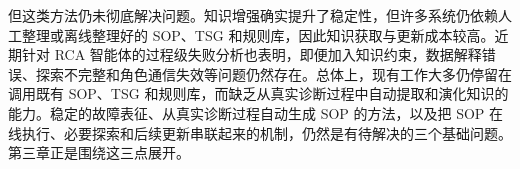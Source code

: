 但这类方法仍未彻底解决问题。知识增强确实提升了稳定性，但许多系统仍依赖人工整理或离线整理好的 SOP、TSG 和规则库，因此知识获取与更新成本较高\cite{an2024nissist,lascasas2024llexus,mao2025agentictsgautomation}。近期针对 RCA 智能体的过程级失败分析也表明，即便加入知识约束，数据解释错误、探索不完整和角色通信失效等问题仍然存在\cite{kim2026agentfailurerca}。总体上，现有工作大多仍停留在调用既有 SOP、TSG 和规则库，而缺乏从真实诊断过程中自动提取和演化知识的能力。稳定的故障表征、从真实诊断过程自动生成 SOP 的方法，以及把 SOP 在线执行、必要探索和后续更新串联起来的机制，仍然是有待解决的三个基础问题。第三章正是围绕这三点展开。

